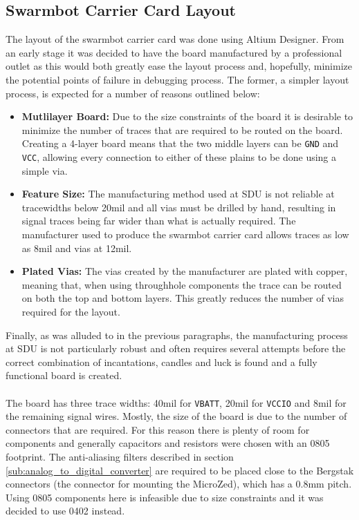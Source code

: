 \subsection{Swarmbot Carrier Card Layout} %
\label{sub:swarmbot_carrier_card_layout}
The layout of the swarmbot carrier card was done using Altium Designer.
From an early stage it was decided to have the board manufactured by a professional outlet as this would both greatly ease the layout process and, hopefully, minimize the potential points of failure in debugging process.
The former, a simpler layout process, is expected for a number of reasons outlined below:
\begin{itemize}
  	\item \textbf{Mutlilayer Board:} Due to the size constraints of the board it is desirable to minimize the number of traces that are required to be routed on the board.
  	Creating a 4-layer board means that the two middle layers can be \texttt{GND} and \texttt{VCC}, allowing every connection to either of these plains to be done using a simple via.
  	\item \textbf{Feature Size:} The manufacturing method used at SDU is not reliable at tracewidths below 20mil and all vias must be drilled by hand, resulting in signal traces being far wider than what is actually required.
  	The manufacturer used to produce the swarmbot carrier card \cite{itead} allows traces as low as 8mil and vias at 12mil.
  	\item \textbf{Plated Vias:} The vias created by the manufacturer are plated with copper, meaning that, when using throughhole components the trace can be routed on both the top and bottom layers.
  	This greatly reduces the number of vias required for the layout.
  \end{itemize}
Finally, as was alluded to in the previous paragraphs, the manufacturing process at SDU is not particularly robust and often requires several attempts before the correct combination of incantations, candles and luck is found and a fully functional board is created.
\\~\\
The board has three trace widths: 40mil for \texttt{VBATT}, 20mil for \texttt{VCCIO} and 8mil for the remaining signal wires.
Mostly, the size of the board is due to the number of connectors that are required.
For this reason there is plenty of room for components and generally capacitors and resistors were chosen with an 0805 footprint.
The anti-aliasing filters described in section \ref{sub:analog_to_digital_converter} are required to be placed close to the Bergstak connectors (the connector for mounting the MicroZed), which has a 0.8mm pitch.
Using 0805 components here is infeasible due to size constraints and it was decided to use 0402 instead.
